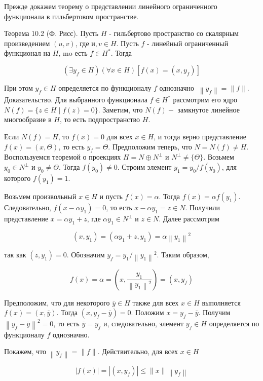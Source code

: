 Прежде докажем теорему о представлении линейного ограниченного функционала в гильбертовом пространстве.

Теорема 10.2 (Ф. Рисс). Пусть $H$ - гильбертово пространство со скалярным произведением $(u, v)$, где $и, v \in H$. Пусть $f$ - линейный ограниченный функционал на $H$, mo есть $f \in H^{*}$. Тогда

\[
\left(\exists y_{f} \in H\right)(\forall x \in H)\left[f(x)=\left(x, y_{f}\right)\right]
\]

При этом $y_{f} \in H$ определяется по функционалу $f$ однозначно $~\left\|y_{f}\right\|=\|f\|$. Доказательство. Для выбранного функционала $f \in H^{*}$ рассмотрим его ядро $N(f)=\{z \in H \mid f(z)=0\}$. Заметим, что $N(f)-$ замкнутое линейное многообразие в $H$, то есть подпространство $H$.

Если $N(f)=H$, то $f(x)=0$ для всех $x \in H$, и тогда верно представление $f(x)=(x, \Theta)$, то есть $y_{f}=\Theta$. Предположим теперь, что $N=N(f) \neq H$. Воспользуемся теоремой о проекциях $H=N \oplus N^{\perp}$ и $N^{\perp} \neq\{\Theta\}$. Возьмем $y_{0} \in N^{\perp}$ и $y_{0} \neq \Theta$. Тогда $f\left(y_{0}\right) \neq 0$. Строим элемент $y_{1}=y_{0} / f\left(y_{0}\right)$, для которого $f\left(y_{1}\right)=1$.

Возьмем произвольный $x \in H$ и пусть $f(x)=\alpha$. Тогда $f(x)=\alpha f\left(y_{1}\right)$. Следовательно, $f\left(x-\alpha y_{1}\right)=0$, то есть $x-\alpha y_{1}=z \in N$. Получили представление $x=\alpha y_{1}+z$, где $\alpha y_{1} \in N^{\perp}$ и $z \in N$. Далее рассмотрим

\[
\left(x, y_{1}\right)=\left(\alpha y_{1}+z, y_{1}\right)=\alpha\left\|y_{1}\right\|^{2}
\]

так как $\left(z, y_{1}\right)=0$. Обозначим $y_{f}=y_{1} /\left\|y_{1}\right\|^{2}$. Таким образом,

\[
f(x)=\alpha=\left(x, \frac{y_{1}}{\left\|y_{1}\right\|^{2}}\right)=\left(x, y_{f}\right)
\]

Предположим, что для некоторого $\bar{y} \in H$ также для всех $x \in H$ выполняется $f(x)=(x, \bar{y})$. Тогда $\left(x, y_{f}-\bar{y}\right)=0$. Положим $x=y_{f}-\bar{y}$. Получим $\left\|y_{f}-\bar{y}\right\|^{2}=0$, то есть $\bar{y}=y_{f}$ и, следовательно, элемент $y_{f} \in H$ определяется по функционалу $f$ однозначно.

Покажем, что $\left\|y_{f}\right\|=\|f\|$. Действительно, для всех $x \in H$

\[
|f(x)|=\left|\left(x, y_{f}\right)\right| \leq\|x\|\left\|y_{f}\right\|
\]

